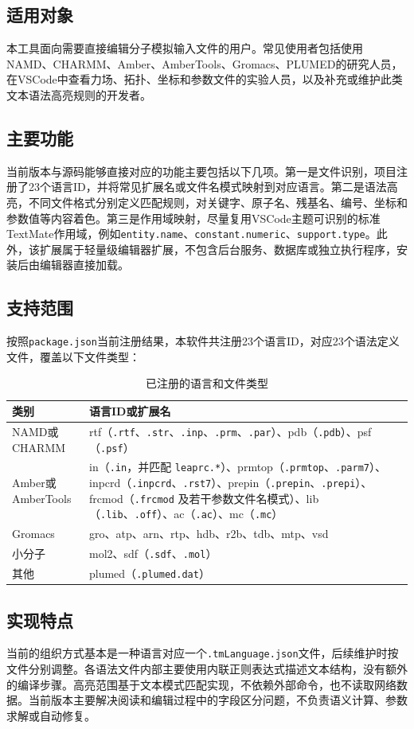 \subsection{适用对象}

本工具面向需要直接编辑分子模拟输入文件的用户。常见使用者包括使用NAMD、CHARMM、Amber、AmberTools、Gromacs、PLUMED的研究人员，在VSCode中查看力场、拓扑、坐标和参数文件的实验人员，以及补充或维护此类文本语法高亮规则的开发者。

\subsection{主要功能}

当前版本与源码能够直接对应的功能主要包括以下几项。第一是文件识别，项目注册了23个语言ID，并将常见扩展名或文件名模式映射到对应语言。第二是语法高亮，不同文件格式分别定义匹配规则，对关键字、原子名、残基名、编号、坐标和参数值等内容着色。第三是作用域映射，尽量复用VSCode主题可识别的标准TextMate作用域，例如\lstinline|entity.name|、\lstinline|constant.numeric|、\lstinline|support.type|。此外，该扩展属于轻量级编辑器扩展，不包含后台服务、数据库或独立执行程序，安装后由编辑器直接加载。

\subsection{支持范围}

按照\lstinline|package.json|当前注册结果，本软件共注册23个语言ID，对应23个语法定义文件，覆盖以下文件类型：

\begin{table}[!h]
\centering
\caption{已注册的语言和文件类型}
\begin{tabular}{p{2cm}p{11cm}}
\toprule
\textbf{类别} & \textbf{语言ID或扩展名} \\
\midrule
NAMD或CHARMM & rtf（\lstinline|.rtf|、\lstinline|.str|、\lstinline|.inp|、\lstinline|.prm|、\lstinline|.par|）、pdb（\lstinline|.pdb|）、psf（\lstinline|.psf|） \\
Amber或AmberTools & in（\lstinline|.in|，并匹配 \lstinline|leaprc.*|）、prmtop（\lstinline|.prmtop|、\lstinline|.parm7|）、inpcrd（\lstinline|.inpcrd|、\lstinline|.rst7|）、prepin（\lstinline|.prepin|、\lstinline|.prepi|）、frcmod（\lstinline|.frcmod| 及若干参数文件名模式）、lib（\lstinline|.lib|、\lstinline|.off|）、ac（\lstinline|.ac|）、mc（\lstinline|.mc|） \\
Gromacs & gro、atp、arn、rtp、hdb、r2b、tdb、mtp、vsd \\
小分子 & mol2、sdf（\lstinline|.sdf|、\lstinline|.mol|） \\
其他 & plumed（\lstinline|.plumed.dat|） \\
\bottomrule
\end{tabular}
\end{table}

\subsection{实现特点}

当前的组织方式基本是一种语言对应一个\lstinline|.tmLanguage.json|文件，后续维护时按文件分别调整。各语法文件内部主要使用内联正则表达式描述文本结构，没有额外的编译步骤。高亮范围基于文本模式匹配实现，不依赖外部命令，也不读取网络数据。当前版本主要解决阅读和编辑过程中的字段区分问题，不负责语义计算、参数求解或自动修复。

